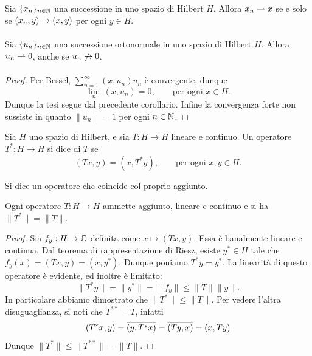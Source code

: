 \begin{corollary}
	Sia $\{x_n\}_{n \in \mathbb{N}}$ una successione in uno spazio di Hilbert $H$.
	Allora $x_n \rightharpoonup x$ se e solo se $(x_n, y) \underset{{}}{\rightarrow} (x,y)$ per ogni $y \in H$.
\end{corollary}

\begin{corollary}
	Sia $\{u_n\}_{n \in \mathbb{N}}$ una successione ortonormale in uno spazio di Hilbert $H$.
	Allora $u_n \rightharpoonup 0$, anche se $u_n \not\underset{{}}{\rightarrow} 0$.
\end{corollary}
\begin{proof}
	Per Bessel, $\sum_{n=1}^\infty (x,u_n) u_n$ è convergente, dunque
	\begin{equation*}
		\lim_n \, (x, u_n) = 0, \qquad \text{per ogni $x \in H$}.
	\end{equation*}
	Dunque la tesi segue dal precedente corollario.
	Infine la convergenza forte non sussiste in quanto $\|u_n\| = 1$ per ogni $n \in \mathbb{N}$.
\end{proof}

\begin{definition}
	Sia $H$ uno spazio di Hilbert, e sia $T:H \to H$ lineare e continuo.
	Un operatore $T^* : H \to H$ si dice  di $T$ se
	\begin{equation*}
		(Tx, y) = (x, T^* y), \qquad \text{per ogni $x,y \in H$}.
	\end{equation*}
\end{definition}

\begin{definition}
	Si dice  un operatore che coincide col proprio aggiunto.
\end{definition}

\begin{lemma}
	Ogni operatore $T:H \to H$ ammette aggiunto, lineare e continuo e si ha $\|T^*\|=\|T\|$.
\end{lemma}
\begin{proof}
	Sia $f_y : H \to \mathbb{C}$ definita come $x \mapsto (Tx, y)$. Essa è banalmente lineare e continua. Dal teorema di rappresentazione di Riesz, esiste $y^* \in H$ tale che $f_y(x) = (Tx,y) =(x, y^*)$. Dunque poniamo $T^* y = y^*$. La linearità di questo operatore è evidente, ed inoltre è limitato:
	\begin{equation*}
		\|T^* y\| = \|y^*\| = \|f_y\| \leq \|T\|\|y\|.
	\end{equation*}
	In particolare abbiamo dimostrato che $\|T^*\| \leq \|T\|$. Per vedere l'altra disuguaglianza, si noti che $T^{**} = T$, infatti
	\begin{equation*}
		(T^*x, y) = \overline{(y, T^*x)} = \overline{(Ty, x)} = (x, Ty)
	\end{equation*}
	Dunque $\|T^*\| \leq \|T^{**}\| = \|T\|$.
\end{proof}

